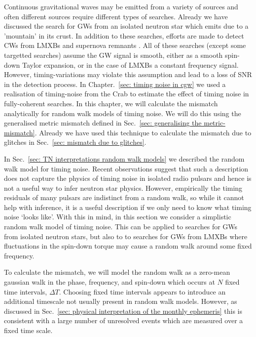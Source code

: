 \documentclass[../full_thesis/full_thesis.tex]{subfiles}
\begin{document}
Continuous gravitational waves may be emitted from a variety of sources and
often different sources require different types of searches.  Already we have
discussed the search for GWs from an isolated neutron star which emits due to a
'mountain' in its crust. In addition to these searches, efforts are made to
detect CWs from LMXBs \citep{ligo2015scox1} and supernova remnants
\citep{ligo_SNR2015}. All of these searches (except some targetted searches)
assume the GW signal is smooth, either as a smooth spin-down Taylor expansion,
or in the case of LMXBs a constant frequency signal. However, timing-variations
may violate this assumption and lead to a loss of SNR in the detection process.
In Chapter.~\ref{sec: timing noise in cgw} we used a realisation of
timing-noise from the Crab to estimate the effect of timing noise in
fully-coherent searches. In this chapter, we will calculate the mismatch
analytically for random walk models of timing noise. We will do this using the
generalised metric mismatch defined in Sec.~\ref{sec: generalising the
metric-mismatch}. Already we have used this technique to calculate the mismatch
due to glitches in Sec.~\eqref{sec: mismatch due to glitches}. 

In Sec.~\ref{sec: TN interpretations random walk models} we described the
random walk model for timing noise. Recent observations \citep{Hobbs2010}
suggest that such a description does not capture the physics of timing noise in
isolated radio pulsars and hence is not a useful way to infer neutron star
physics. However, empirically the timing residuals of many pulsars are
indistinct from a random walk, so while it cannot help with inference, it is a
useful description if we only need to know what timing noise `looks like'. With
this in mind, in this section we consider a simplistic random walk model of
timing noise. This can be applied to searches for GWs from isolated neutron
stars, but also to to searches for GWs from LMXBs where fluctuations in the
spin-down torque may cause a random walk around some fixed frequency.

To calculate the mismatch, we will model the random walk as a zero-mean
gaussian walk in the phase, frequency, and spin-down which occurs at $N$ fixed
time intervals, $\Delta T$. Choosing fixed time intervals appears to introduce
an additional timescale not usually present in random walk models. However, as
discussed in Sec.~\ref{sec: physical interpretation of the monthly
ephemeris} this is consistent with a large number of unresolved events which
are measured over a fixed time scale.
\end{document}
